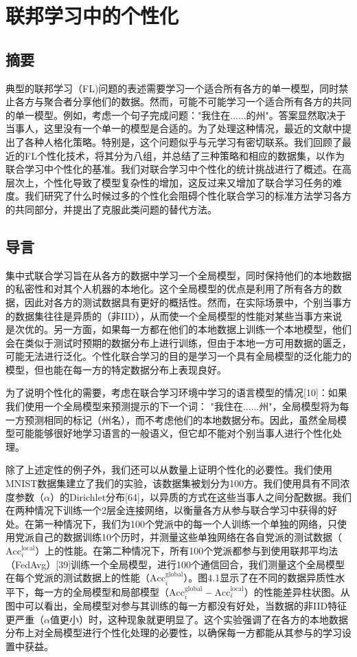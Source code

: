 \chapter{联邦学习中的个性化}

\section*{摘要}
典型的联邦学习（FL)问题的表述需要学习一个适合所有各方的单一模型，同时禁止各方与聚合者分享他们的数据。然而，可能不可能学习一个适合所有各方的共同的单一模型。例如，考虑一个句子完成问题："我住在......的州"。答案显然取决于当事人，这里没有一个单一的模型是合适的。为了处理这种情况，最近的文献中提出了各种人格化策略。特别是，这个问题似乎与元学习有密切联系。我们回顾了最近的FL个性化技术，将其分为八组，并总结了三种策略和相应的数据集，以作为联合学习中个性化的基准。我们对联合学习中个性化的统计挑战进行了概述。在高层次上，个性化导致了模型复杂性的增加，这反过来又增加了联合学习任务的难度。我们研究了什么时候过多的个性化会阻碍个性化联合学习的标准方法学习各方的共同部分，并提出了克服此类问题的替代方法。

\section{导言}
集中式联合学习旨在从各方的数据中学习一个全局模型，同时保持他们的本地数据的私密性和对其个人机器的本地化。这个全局模型的优点是利用了所有各方的数据，因此对各方的测试数据具有更好的概括性。然而，在实际场景中，个别当事方的数据集往往是异质的（非IID），从而使一个全局模型的性能对某些当事方来说是次优的。另一方面，如果每一方都在他们的本地数据上训练一个本地模型，他们会在类似于测试时预期的数据分布上进行训练，但由于本地一方可用数据的匮乏，可能无法进行泛化。个性化联合学习的目的是学习一个具有全局模型的泛化能力的模型，但也能在每一方的特定数据分布上表现良好。

为了说明个性化的需要，考虑在联合学习环境中学习的语言模型的情况[10]：如果我们使用一个全局模型来预测提示的下一个词： "我住在......州"，全局模型将为每一方预测相同的标记（州名），而不考虑他们的本地数据分布。因此，虽然全局模型可能能够很好地学习语言的一般语义，但它却不能对个别当事人进行个性化处理。

除了上述定性的例子外，我们还可以从数量上证明个性化的必要性。我们使用MNIST数据集建立了我们的实验，该数据集被划分为100方。我们使用具有不同浓度参数（$α$）的Dirichlet分布[64]，以异质的方式在这些当事人之间分配数据。我们在两种情况下训练一个2层全连接网络，以衡量各方从参与联合学习中获得的好处。在第一种情况下，我们为100个党派中的每一个人训练一个单独的网络，只使用党派自己的数据训练10个历时，并测量这些单独网络在各自党派的测试数据（$\text{Acc}_{i}^{\text{local}}$）上的性能。在第二种情况下，所有100个党派都参与到使用联邦平均法（FedAvg）[39]训练一个全局模型，进行100个通信回合，我们测量这个全局模型在每个党派的测试数据上的性能（$\text{Acc}_{i}^{\text{global}}$）。图4.1显示了在不同的数据异质性水平下，每一方的全局模型和局部模型（$\text{Acc}_{i}^{\text{global}} - \text{Acc}_{i}^{\text{local}}$）的性能差异柱状图。从图中可以看出，全局模型对参与其训练的每一方都没有好处，当数据的非IID特征更严重（$\alpha$值更小）时，这种现象就更明显了。这个实验强调了在各方的本地数据分布上对全局模型进行个性化处理的必要性，以确保每一方都能从其参与的学习设置中获益。

